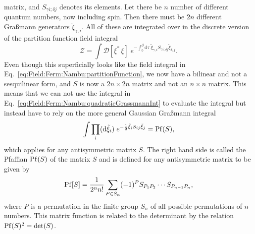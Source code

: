 matrix, and $S_{\gamma i; \delta j}$ denotes its elements. Let there be $n$ number of different quantum numbers,
now including spin. Then there must be $2n$ different Gra\ss mann generators $\tilde{\xi}_{\gamma,i}$. All of these are integrated over in the discrete version
of the partition function field integral
\begin{equation}
    \label{eq:Field:Ferm:ExNambu:partitionFunction}
    \mathcal{Z} = \int\!\mathcal{D}[\xi^\ast\,\xi]\;e^{-\int_0^\beta\!\mathrm{d}\tau\;\tilde{\xi}_{\gamma,i}S_{\gamma i; \delta j}\tilde{\xi}_{\delta, j}}.
\end{equation}
Even though this superficially looks like the field integral in Eq.~\eqref{eq:Field:Ferm:Nambu:partitionFunction}, we now have a bilinear and not a sesquilinear
form, and $S$ is now a $2n\times2n$ matrix and not an $n\times n$ matrix. This means that we can not use the integral in Eq.~\eqref{eq:Field:Ferm:Nambu:quadraticGrassmannInt}
to evaluate the integral but instead have to rely on the more general Gaussian Gra\ss mann integral
\begin{equation}
    \label{eq:Field:Ferm:ExNambu:pfaffianIntegral}
    \int\prod_{i}(\mathrm{d}\tilde{\xi}_i)\;e^{-\frac{1}{2}\tilde{\xi}_iS_{ij}\tilde{\xi}_j} = \operatorname{Pf}(S),
\end{equation}
which applies for any antisymmetric matrix $S$. The right hand side is called the Pfaffian $\operatorname{Pf}(S)$ of the matrix $S$ and is defined for any antisymmetric
matrix to be given by
\begin{equation}
    \label{eq:Field:Ferm:ExNambu:pfaffianDef}
    \operatorname{Pf}[S] = \frac{1}{2^nn!}\sum_{P\in S_n}(-1)^PS_{P_1P_2}\cdots S_{P_{n-1}P_n},
\end{equation}
where $P$ is a permutation in the finite group $S_n$ of all possible permutations of $n$ numbers. This matrix function is related to the determinant
by the relation $\operatorname{Pf}(S)^2 = \det(S)$. 


